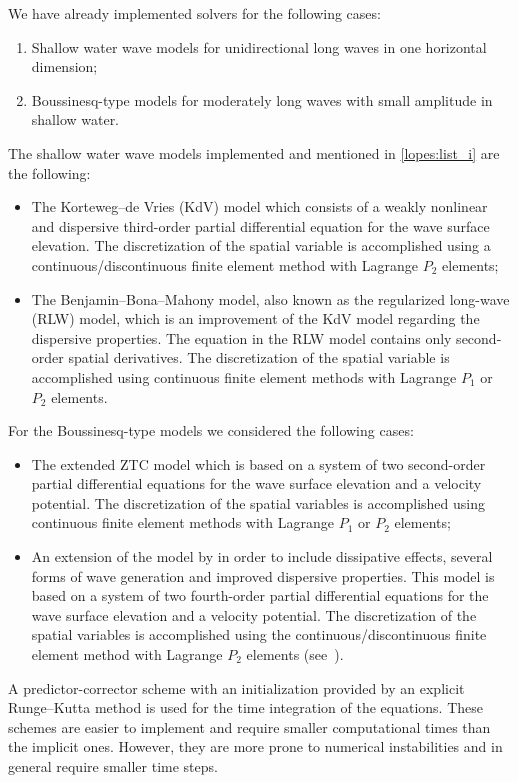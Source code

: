 We have already implemented solvers for the following cases:
\begin{enumerate}
\item \label{lopes:list_i} Shallow water wave models for unidirectional
  long waves in one horizontal dimension;
\item  Boussinesq-type models for moderately long
  waves with small amplitude in shallow water.
\end{enumerate}
The shallow water wave models implemented and mentioned in
\ref{lopes:list_i} are the following:
\begin{itemize}
\item The Korteweg--de Vries (KdV) model which consists of a weakly
  nonlinear and dispersive third-order partial differential equation
  for the wave surface elevation. The discretization of the spatial
  variable is accomplished using a continuous/discontinuous finite
  element method with Lagrange $P_2$ elements;
\item The Benjamin--Bona--Mahony model, also known as the regularized
  long-wave (RLW) model, which is an improvement of the KdV model
  regarding the dispersive properties.  The equation in the RLW model
  contains only second-order spatial derivatives. The discretization
  of the spatial variable is accomplished using continuous finite
  element methods with Lagrange $P_1$ or $P_2$ elements.
\end{itemize}
For the Boussinesq-type models we considered the following
cases:
\begin{itemize}
\item The extended ZTC model which is based on a system of two
  second-order partial differential equations for the wave surface
  elevation and a velocity potential. The discretization of the
  spatial variables is accomplished using continuous finite element
  methods with Lagrange $P_1$ or $P_2$ elements;
 \item An extension of the model by \citet{ChenLiu1994} in order to
   include dissipative effects, several forms of wave generation and
   improved dispersive properties. This model is based on a system of
   two fourth-order partial differential equations for the wave
   surface elevation and a velocity potential. The discretization of
   the spatial variables is accomplished using the
   continuous/discontinuous finite element method with Lagrange $P_2$
   elements (see~\citet{LopesPereiraTrabucho}).
\end{itemize}

A predictor-corrector scheme with an initialization provided by an
explicit Runge--Kutta method is used for the time integration of the
equations.  These schemes are easier to implement and require smaller
computational times than the implicit ones.  However, they are more
prone to numerical instabilities and in general require smaller time
steps.

